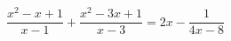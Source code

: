 \begin{ex}[type=equation]
	\begin{condition}
		$\dfrac{x^2 - x+ 1}{x - 1} + \dfrac{x^2 - 3x + 1}{x - 3} = 2x -\dfrac{1}{4x - 8}$
	\end{condition}
\end{ex}